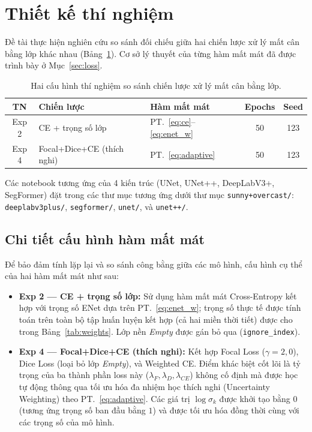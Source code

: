 \section{Thiết kế thí nghiệm}
\label{sec:experiment_design}

Đề tài thực hiện nghiên cứu so sánh đối chiếu giữa hai chiến lược xử lý mất cân bằng lớp khác nhau (Bảng~\ref{tab:experiments}). Cơ sở lý thuyết của từng hàm mất mát đã được trình bày ở Mục~\ref{sec:loss}.

\begin{table}[H]
\centering
\caption{Hai cấu hình thí nghiệm so sánh chiến lược xử lý mất cân bằng lớp.}
\label{tab:experiments}
\small
\begin{tabular}{c l l c c}
\toprule
\textbf{TN} & \textbf{Chiến lược} & \textbf{Hàm mất mát} & \textbf{Epochs} & \textbf{Seed} \\
\midrule
Exp 2 & CE + trọng số lớp & PT.~\eqref{eq:ce}--\eqref{eq:enet_w} & 50 & 123 \\
Exp 4 & Focal+Dice+CE (thích nghi) & PT.~\eqref{eq:adaptive} & 50 & 123 \\
\bottomrule
\end{tabular}
\end{table}

\noindent Các notebook tương ứng của 4 kiến trúc (UNet, UNet++, DeepLabV3+, SegFormer) đặt trong các thư mục tương ứng dưới thư mục \texttt{sunny+overcast/}: \texttt{deeplabv3plus/}, \texttt{segformer/}, \texttt{unet/}, và \texttt{unet++/}.

\subsection{Chi tiết cấu hình hàm mất mát}
Để bảo đảm tính lặp lại và so sánh công bằng giữa các mô hình, cấu hình cụ thể của hai hàm mất mát như sau:
\begin{itemize}[leftmargin=1.4cm]
  \item \textbf{Exp 2 --- CE + trọng số lớp:} Sử dụng hàm mất mát Cross-Entropy kết hợp với trọng số ENet dựa trên PT.~\eqref{eq:enet_w}; trọng số thực tế được tính toán trên toàn bộ tập huấn luyện kết hợp (cả hai miền thời tiết) được cho trong Bảng~\ref{tab:weights}. Lớp nền \textit{Empty} được gán bỏ qua (\texttt{ignore\_index}).
  \item \textbf{Exp 4 --- Focal+Dice+CE (thích nghi):} Kết hợp Focal Loss ($\gamma=2{,}0$), Dice Loss (loại bỏ lớp \textit{Empty}), và Weighted CE. Điểm khác biệt cốt lõi là tỷ trọng của ba thành phần loss này ($\lambda_F, \lambda_D, \lambda_{CE}$) không cố định mà được học tự động thông qua tối ưu hóa đa nhiệm học thích nghi (Uncertainty Weighting) theo PT.~\eqref{eq:adaptive}. Các giá trị $\log\sigma_k$ được khởi tạo bằng $0$ (tương ứng trọng số ban đầu bằng $1$) và được tối ưu hóa đồng thời cùng với các trọng số của mô hình.
\end{itemize}

